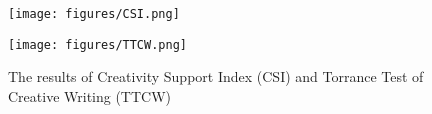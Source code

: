 \begin{figure}[ht!]
\centering
\begin{minipage}[t]{.4745\linewidth}
    \vspace{0pt}
    \texttt{[image: figures/CSI.png]}
\end{minipage}
\begin{minipage}[t]{.32\linewidth}
    \vspace{0pt}
    \texttt{[image: figures/TTCW.png]}
\end{minipage}
\caption{The results of Creativity Support Index (CSI) and Torrance Test of Creative Writing (TTCW)}
\label{fig:CSI}
\end{figure}